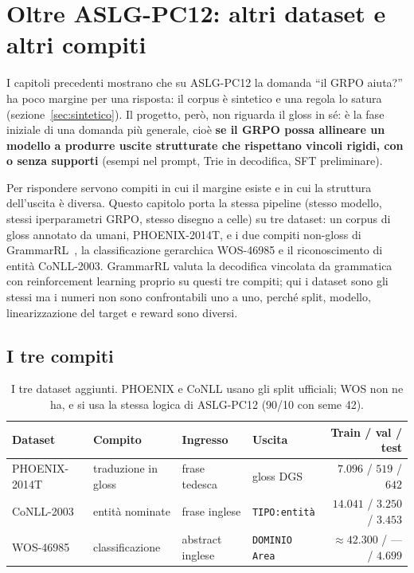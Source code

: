 \chapter{Oltre ASLG-PC12: altri dataset e altri compiti}
\label{cap:altri-dataset}

I capitoli precedenti mostrano che su ASLG-PC12 la domanda ``il GRPO aiuta?'' ha
poco margine per una risposta: il corpus è sintetico e una regola lo satura
(sezione~\ref{sec:sintetico}). Il progetto, però, non riguarda il gloss in sé: è
la fase iniziale di una domanda più generale, cioè \textbf{se il GRPO possa
allineare un modello a produrre uscite strutturate che rispettano vincoli rigidi,
con o senza supporti} (esempi nel prompt, Trie in decodifica, SFT preliminare).

Per rispondere servono compiti in cui il margine esiste e in cui la struttura
dell'uscita è diversa. Questo capitolo porta la stessa pipeline (stesso modello,
stessi iperparametri GRPO, stesso disegno a celle) su tre dataset: un corpus di
gloss annotato da umani, PHOENIX-2014T, e i due compiti non-gloss di
GrammarRL~\cite{tuccio2026grammarrl}, la classificazione gerarchica WOS-46985 e
il riconoscimento di entità CoNLL-2003. GrammarRL valuta la decodifica vincolata
da grammatica con reinforcement learning proprio su questi tre compiti; qui i
dataset sono gli stessi ma i numeri non sono confrontabili uno a uno, perché
split, modello, linearizzazione del target e reward sono diversi.

\section{I tre compiti}

\begin{table}[h]
\centering
\footnotesize
\begin{tabular}{llllr}
\toprule
Dataset & Compito & Ingresso & Uscita & Train / val / test \\
\midrule
PHOENIX-2014T & traduzione in gloss & frase tedesca & gloss DGS & $7.096$ / $519$ / $642$ \\
CoNLL-2003    & entità nominate & frase inglese & \texttt{TIPO:entità} & $14.041$ / $3.250$ / $3.453$ \\
WOS-46985     & classificazione & abstract inglese & \texttt{DOMINIO Area} & $\approx 42.300$ / --- / $4.699$ \\
\bottomrule
\end{tabular}
\caption{I tre dataset aggiunti. PHOENIX e CoNLL usano gli split ufficiali;
WOS non ne ha, e si usa la stessa logica di ASLG-PC12 (90/10 con seme 42).}
\label{tab:altri-dataset}
\end{table}

